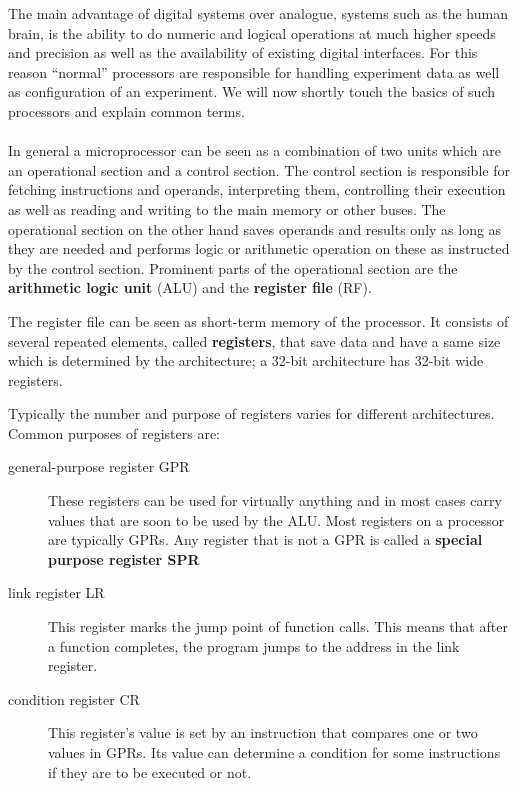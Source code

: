 The main advantage of digital systems over analogue, systems such as the human brain, is the ability to do numeric and logical operations at much higher speeds and precision as well as the availability of existing digital interfaces.
For this reason ``normal'' processors are responsible for handling experiment data as well as configuration of an experiment.
We will now shortly touch the basics of such processors and explain common terms.
\\
\\
In general a microprocessor can be seen as a combination of two units which are an operational section and a control section.
The control section is responsible for fetching instructions and operands, interpreting them, controlling their execution as well as reading and writing to the main memory or other buses.
The operational section on the other hand saves operands and results only as long as they are needed and performs logic or arithmetic operation on these as instructed by the control section.
Prominent parts of the operational section are the \textbf{arithmetic logic unit} (ALU) and the \textbf{register file} (RF).

The register file can be seen as short-term memory of the processor.
It consists of several repeated elements, called \textbf{registers}, that save data and have a same size which is determined by the architecture; a 32-bit architecture has 32-bit wide registers.

Typically the number and purpose of registers varies for different architectures.
Common purposes of registers are:
\begin{description}
    \item[general-purpose register GPR] These registers can be used for virtually anything and in most cases carry values that are soon to be used by the ALU. Most registers on a processor are typically GPRs.
        Any register that is not a GPR is called a \textbf{special purpose register SPR}
    \item[link register LR] This register marks the jump point of function calls. This means that after a function completes, the program jumps to the address in the link register.
    \item[condition register CR] This register's value is set by an instruction that compares one or two values in GPRs. Its value can determine a condition for some instructions if they are to be executed or not.
\end{description}        


